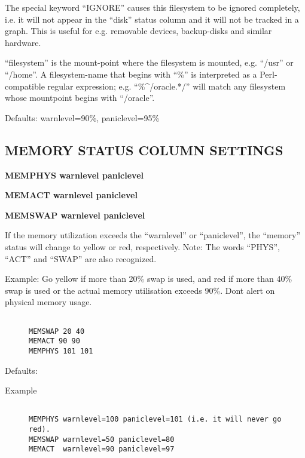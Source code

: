   The special keyword ``IGNORE'' causes this filesystem to be ignored completely, i.e. it will not appear in the ``disk'' status column and it will not be tracked in a graph. This is useful for e.g. removable devices, backup-disks and similar hardware. 


  ``filesystem'' is the mount-point where the filesystem is mounted, e.g. ``/usr'' or ``/home''. A filesystem-name that begins with ``\%'' is interpreted as a Perl-compatible regular expression; e.g. ``\%\^{}/oracle.*/'' will match any filesystem whose mountpoint begins with ``/oracle''. 


  Defaults: warnlevel=90\%, paniclevel=95\% 


 
\subsection{MEMORY STATUS COLUMN SETTINGS}


 \textbf{MEMPHYS warnlevel paniclevel}
 
\textbf{MEMACT warnlevel paniclevel}
 
\textbf{MEMSWAP warnlevel paniclevel}



  If the memory utilization exceeds the ``warnlevel'' or ``paniclevel'', the ``memory'' status will change to yellow or red, respectively. Note: The words ``PHYS'', ``ACT'' and ``SWAP'' are also recognized. 


  Example: Go yellow if more than 20\% swap is used, and red if more
  than 40\% swap is used or the actual memory utilisation exceeds
  90\%. Dont alert on physical memory usage. 

\begin{description}
\item[]
\begin{verbatim}

MEMSWAP 20 40
MEMACT 90 90
MEMPHYS 101 101

\end{verbatim}


\end{description}



  Defaults: \begin{description}
\item[Example]
\begin{verbatim}

MEMPHYS warnlevel=100 paniclevel=101 (i.e. it will never go red).
MEMSWAP warnlevel=50 paniclevel=80
MEMACT  warnlevel=90 paniclevel=97

\end{verbatim}


\end{description}




